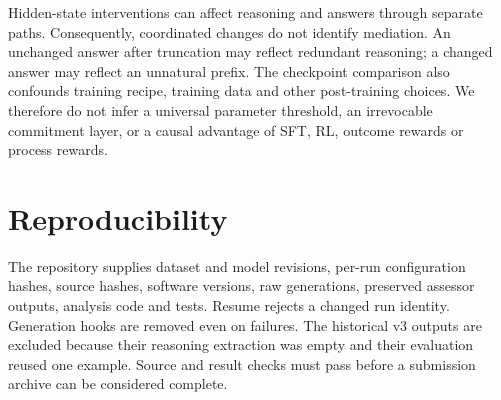 \documentclass[11pt]{article}
\begin{document}
Hidden-state interventions can affect reasoning and answers through separate paths.
Consequently, coordinated changes do not identify mediation. An unchanged answer
after truncation may reflect redundant reasoning; a changed answer may reflect
an unnatural prefix. The checkpoint comparison also confounds training recipe,
training data and other post-training choices. We therefore do not infer a universal
parameter threshold, an irrevocable commitment layer, or a causal advantage of
SFT, RL, outcome rewards or process rewards.

\section{Reproducibility}
The repository supplies dataset and model revisions, per-run configuration hashes,
source hashes, software versions, raw generations, preserved assessor outputs,
analysis code and tests. Resume rejects a changed run identity. Generation hooks are
removed even on failures. The historical v3 outputs are excluded because their
reasoning extraction was empty and their evaluation reused one example. Source and
result checks must pass before a submission archive can be considered complete.



\end{document}
